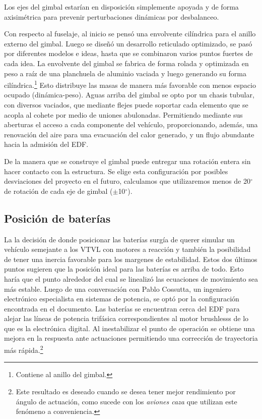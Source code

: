 \medskip 

Los ejes del gimbal estarían en disposición simplemente apoyada y de forma axisimétrica para prevenir perturbaciones dinámicas por desbalanceo.

\medskip

Con respecto al fuselaje, al inicio se pensó una envolvente cilíndrica para el anillo externo del
gimbal. Luego se diseñó un desarrollo reticulado optimizado, se pasó por diferentes modelos e
ideas, hasta que se combinaron varios puntos fuertes de cada idea. La envolvente del gimbal se fabrica de forma rolada y optimizada en peso a raíz de
una planchuela de aluminio vaciada y luego generando su forma cilíndrica.\footnote{Contiene al
anillo del gimbal.} Esto distribuye las masas de manera más favorable con menos espacio
ocupado (dinámica-peso). Aguas arriba del gimbal se opto por un chasis tubular, con diversos
vaciados, que mediante flejes puede soportar cada elemento que se acopla al cohete por
medio de uniones abulonadas. Permitiendo mediante sus aberturas el acceso a cada
componente del vehículo, proporcionando, además, una renovación del aire para una
evacuación del calor generado, y un flujo abundante hacia la admisión del EDF.

\medskip

De la manera que se construye el gimbal puede entregar una rotación entera sin hacer contacto con la estructura. Se elige esta configuración por posibles desviaciones del proyecto en el
futuro, calculamos que utilizaremos menos de 20$^\circ$ de rotación de cada eje de gimbal ($\pm$10$^\circ$).

\subsection{Posición de baterías}

La la decisión de donde posicionar las baterías surgía de querer simular un vehículo semejante a los VTVL con motores a reacción y también la posibilidad de tener una inercia favorable para los margenes de estabilidad. Estos dos últimos puntos sugieren que la posición ideal para las baterías es arriba de todo. Esto haría que el punto alrededor del cual se linealizó las ecuaciones de movimiento sea más estable. Luego de una conversación con Pablo Cossutta, un ingeniero electrónico especialista en sistemas de potencia, se optó por la configuración encontrada en el documento. Las baterías se encuentran cerca del EDF para alejar las líneas de potencia trifásica correspondientes al motor brushlesss de lo que es la electrónica digital. Al inestabilizar el punto de operación se obtiene una mejora en la respuesta ante actuaciones permitiendo una corrección de trayectoria más rápida.\footnote{Este resultado es deseado cuando se desea tener mejor rendimiento por ángulo de actuación, como sucede con los \textit{aviones caza} que utilizan este fenómeno a conveniencia.}


